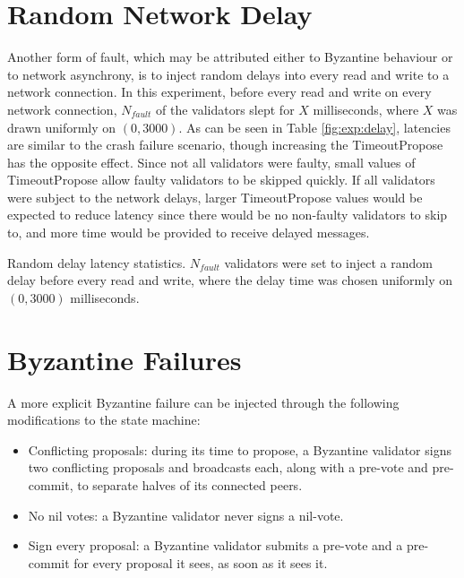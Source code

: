 \section{Random Network Delay}

Another form of fault, which may be attributed either to Byzantine behaviour or to network asynchrony,
is to inject random delays into every read and write to a network connection.
In this experiment, before every read and write on every network connection,
$N_{fault}$ of the validators slept for $X$ milliseconds, 
where $X$ was drawn uniformly on $(0, 3000)$.
As can be seen in Table \ref{fig:exp:delay}, 
latencies are similar to the crash failure scenario, 
though increasing the TimeoutPropose has the opposite effect.
Since not all validators were faulty, 
small values of TimeoutPropose allow faulty validators to be skipped quickly. 
If all validators were subject to the network delays, 
larger TimeoutPropose values would be expected to reduce latency
since there would be no non-faulty validators to skip to,
and more time would be provided to receive delayed messages.

\begin{table}[]
	
	\caption[Latency statistics under randomized delays]{Random delay latency statistics. $N_{fault}$ validators were set to inject a random delay
before every read and write, where the delay time was chosen uniformly on $(0, 3000)$ milliseconds.}
	\label{fig:exp:delay}
\end{table}


\section{Byzantine Failures}

A more explicit Byzantine failure can be injected through the following modifications
to the state machine:

\begin{itemize}
\item{Conflicting proposals: during its time to propose, a Byzantine validator signs two conflicting proposals and broadcasts each, along with a pre-vote and pre-commit, to separate halves of its connected peers.} 
\item{No nil votes: a Byzantine validator never signs a nil-vote.}
\item{Sign every proposal: a Byzantine validator submits a pre-vote and a pre-commit for every proposal it sees, as soon as it sees it.}
\end{itemize}

